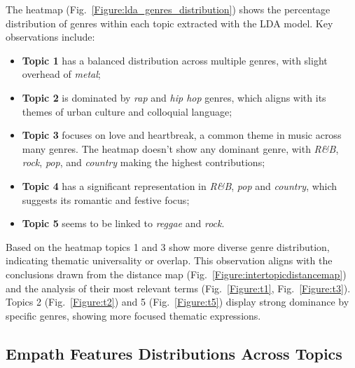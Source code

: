 The heatmap (Fig.~\ref{Figure:lda_genres_distribution}) shows the percentage
distribution of genres within each topic extracted with the LDA model. Key
observations include:

\begin{itemize}
  \item \textbf{Topic 1} has a balanced distribution across multiple genres,
    with slight overhead of \textit{metal};
  \item \textbf{Topic 2} is dominated by \textit{rap} and \textit{hip hop}
    genres, which aligns with its themes of urban culture and colloquial
    language;
  \item \textbf{Topic 3} focuses on love and heartbreak, a common theme in
    music across many genres. The heatmap doesn't show any dominant genre, with
    \textit{R\&B}, \textit{rock}, \textit{pop}, and \textit{country} making the
    highest contributions;
  \item \textbf{Topic 4} has a significant representation in \textit{R\&B},
    \textit{pop} and \textit{country}, which suggests its romantic and festive
    focus;
  \item \textbf{Topic 5} seems to be linked to \textit{reggae} and
    \textit{rock}.
\end{itemize}

Based on the heatmap topics 1 and 3 show more diverse genre distribution,
indicating thematic universality or overlap. This observation aligns with the
conclusions drawn from the  distance map
(Fig.~\ref{Figure:intertopicdistancemap}) and the analysis of their most
relevant terms (Fig.~\ref{Figure:t1}, Fig.~\ref{Figure:t3}). Topics 2
(Fig.~\ref{Figure:t2}) and 5 (Fig.~\ref{Figure:t5}) display strong dominance by
specific genres, showing more focused thematic expressions.


\subsection{Empath Features Distributions Across Topics}

